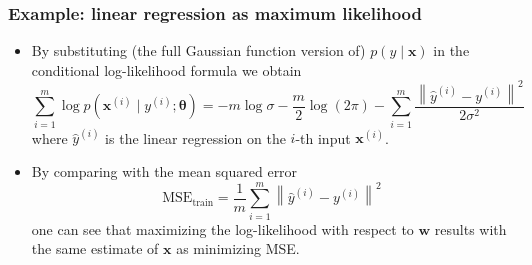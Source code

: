 \documentclass[notes]{beamer}          %
\newcommand{\vect}[1]{\bm{#1}}
\newcommand{\norm}[1]{\left\lVert#1\right\rVert}
\providecommand{\norm}[1]{\lVert#1\rVert}
\newif\iffull
\begin{document}
\begin{frame}
\frametitle{Example: linear regression as maximum likelihood}
    \begin{itemize}
        \item By substituting (the full Gaussian function version of) $p(y \mid \vect{x})$ in the conditional log-likelihood formula we obtain
        $$
        \sum_{i=1}^{m} \log p(\vect{x}^{(i)} \mid y^{(i)}; \vect{\theta}) =
        -m \log \sigma - \frac{m}{2} \log(2\pi) - \sum_{i=1}^{m }\frac{\norm{\hat{y}^{(i)} - y^{(i)}}^2}{2 \sigma^2}
        $$
        where $\hat{y}^{(i)}$ is the linear regression on the $i$-th input $\vect{x}^{(i)}$.
        \item By comparing with the mean squared error
        $$
           \mbox{MSE}_{\mbox{train}} = \frac{1}{m} \sum_{i=1}^{m} \norm{\hat{y}^{(i)} - y^{(i)}}^2
        $$
        one can see that maximizing the log-likelihood with respect to $\vect{w}$ results with the same estimate of $\vect{x}$ as minimizing MSE. \iffull {\small (The third term in the log-likelihood forumula, needs to be as small as possible.)} \fi
    \end{itemize}
\end{frame}

\iffull
\begin{frame}
\frametitle{Properties of maximum likelihood}
    \begin{itemize}
        \item It can be shown that the maximum likelihood estimator is the best asymptotically, i.e. as $m \rightarrow \infty$, in terms of its convergence rate.
        \item {\bf Property of consistency}: as the number of training examples approaches infinity the maximum likelihood estimate of a parameter converges towards the true parameter value.
        \item The maximum likelihood estimator has the property of consistency provided:
            \begin{itemize}
                \item The true distribution $p_{\mbox{data}}$ is in the model family
                $p_{\mbox{model}}(\cdot; \vect{\theta})$ %
                \item $p_{\mbox{data}}$ corresponds to exactly one value of $\vect{\theta}$ \\
            \end{itemize}
    \end{itemize}
\end{frame}
\fi
\end{document}
